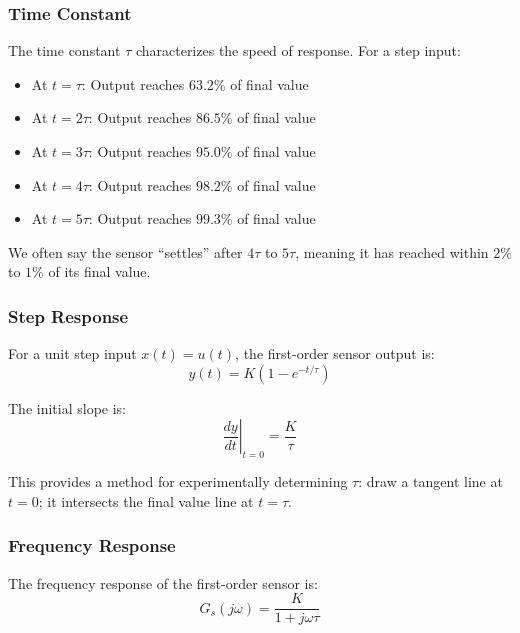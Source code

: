\subsubsection{Time Constant}

The time constant $\tau$ characterizes the speed of response. For a step input:
\begin{itemize}
    \item At $t = \tau$: Output reaches $63.2\%$ of final value
    \item At $t = 2\tau$: Output reaches $86.5\%$ of final value
    \item At $t = 3\tau$: Output reaches $95.0\%$ of final value
    \item At $t = 4\tau$: Output reaches $98.2\%$ of final value
    \item At $t = 5\tau$: Output reaches $99.3\%$ of final value
\end{itemize}

We often say the sensor ``settles'' after $4\tau$ to $5\tau$, meaning it has reached within $2\%$ to $1\%$ of its final value.

\subsubsection{Step Response}

For a unit step input $x(t) = u(t)$, the first-order sensor output is:
\begin{equation}
y(t) = K\left(1 - e^{-t/\tau}\right)
\label{eq:first_order_step}
\end{equation}

The initial slope is:
\begin{equation}
\left.\frac{dy}{dt}\right|_{t=0} = \frac{K}{\tau}
\label{eq:initial_slope}
\end{equation}

This provides a method for experimentally determining $\tau$: draw a tangent line at $t=0$; it intersects the final value line at $t = \tau$.

\subsubsection{Frequency Response}

The frequency response of the first-order sensor is:
\begin{equation}
G_s(j\omega) = \frac{K}{1 + j\omega\tau}
\label{eq:first_order_freq}
\end{equation}


